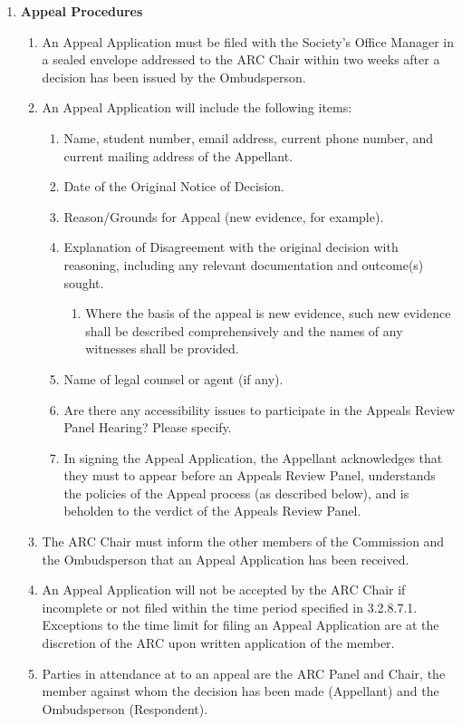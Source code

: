 \begin{enumerate} [align=left]
\item \textbf{Appeal Procedures}
\begin{enumerate} [label*=\arabic*., align=left]
\item An Appeal Application must be filed with the Society's Office Manager in a sealed envelope addressed to the ARC Chair within two weeks after a decision has been issued by the Ombudsperson.
\item An Appeal Application will include the following items:
\begin{enumerate} [label*=\arabic*., align=left]
\item Name, student number, email address, current phone number, and current mailing address of the Appellant.
\item Date of the Original Notice of Decision.
\item Reason/Grounds for Appeal (new evidence, for example).
\item Explanation of Disagreement with the original decision with reasoning, including any relevant documentation and outcome(s) sought.
\begin{enumerate} [label*=\arabic*., align=left]
\item Where the basis of the appeal is new evidence, such new evidence shall be described comprehensively and the names of any witnesses shall be provided.
\end{enumerate}
\item Name of legal counsel or agent (if any).
\item Are there any accessibility issues to participate in the Appeals Review Panel Hearing? Please specify.
\item In signing the Appeal Application, the Appellant acknowledges that they must to appear before an Appeals Review Panel, understands the policies of the Appeal process (as described below), and is beholden to the verdict of the Appeals Review Panel.
\end{enumerate}
\item The ARC Chair must inform the other members of the Commission and the Ombudsperson that an Appeal Application has been received.
\item An Appeal Application will not be accepted by the ARC Chair if incomplete or not filed within the time period specified in 3.2.8.7.1. Exceptions to the time limit for filing an Appeal Application are at the discretion of the ARC upon written application of the member.
\item Parties in attendance at to an appeal are the ARC Panel and Chair, the member against whom the decision has been made (Appellant) and the Ombudsperson (Respondent). 

\end{enumerate}
\end{enumerate}
